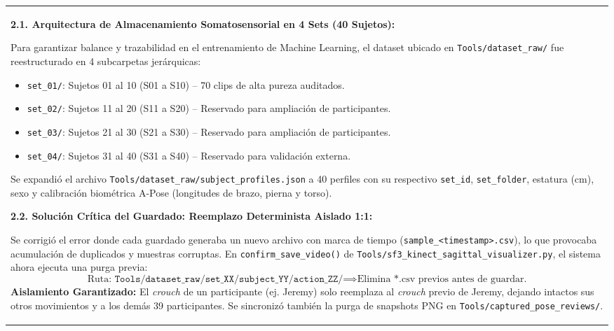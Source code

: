 \documentclass[10pt,a4paper]{article}
\begin{document}
{\begin{tabularx}{\textwidth}{|X|}
{    \textbf{2.1. Arquitectura de Almacenamiento Somatosensorial en 4 Sets (40 Sujetos):}\par
    Para garantizar balance y trazabilidad en el entrenamiento de Machine Learning, el dataset ubicado en \texttt{Tools/dataset\_raw/} fue reestructurado en 4 subcarpetas jerárquicas:
    \begin{itemize}[noitemsep,topsep=2pt]
        \item \texttt{set\_01/}: Sujetos 01 al 10 (S01 a S10) -- 70 clips de alta pureza auditados.
        \item \texttt{set\_02/}: Sujetos 11 al 20 (S11 a S20) -- Reservado para ampliación de participantes.
        \item \texttt{set\_03/}: Sujetos 21 al 30 (S21 a S30) -- Reservado para ampliación de participantes.
        \item \texttt{set\_04/}: Sujetos 31 al 40 (S31 a S40) -- Reservado para validación externa.
    \end{itemize}
    Se expandió el archivo \texttt{Tools/dataset\_raw/subject\_profiles.json} a 40 perfiles con su respectivo \texttt{set\_id}, \texttt{set\_folder}, estatura (cm), sexo y calibración biométrica A-Pose (longitudes de brazo, pierna y torso).

    \vspace{0.15cm}
    \textbf{2.2. Solución Crítica del Guardado: Reemplazo Determinista Aislado 1:1:}\par
    Se corrigió el error donde cada guardado generaba un nuevo archivo con marca de tiempo (\texttt{sample\_<timestamp>.csv}), lo que provocaba acumulación de duplicados y muestras corruptas. En \texttt{confirm\_save\_video()} de \texttt{Tools/sf3\_kinect\_sagittal\_visualizer.py}, el sistema ahora ejecuta una purga previa:
    $$\text{Ruta: } \texttt{Tools/dataset\_raw/set\_XX/subject\_YY/action\_ZZ/} \implies \text{Elimina *.csv previos antes de guardar.}$$
    \textbf{Aislamiento Garantizado:} El \textit{crouch} de un participante (ej. Jeremy) solo reemplaza al \textit{crouch} previo de Jeremy, dejando intactos sus otros movimientos y a los demás 39 participantes. Se sincronizó también la purga de snapshots PNG en \texttt{Tools/captured\_pose_reviews/}.

}
\end{tabularx}}
\end{document}
